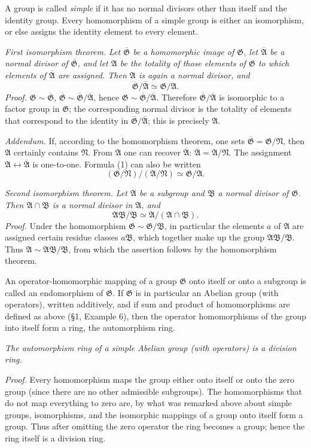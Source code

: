 \documentclass[11pt]{article}
\providecommand{\mG}{\mathfrak{G}}
\providecommand{\mA}{\mathfrak{A}}
\providecommand{\mB}{\mathfrak{B}}
\providecommand{\mN}{\mathfrak{N}}
\begin{document}
A group is called \emph{simple} if it has no normal divisors other than itself and the identity group. Every homomorphism of a simple group is either an isomorphism, or else assigns the identity element to every element.

\emph{First isomorphism theorem.} \emph{Let $\overline{\mG}$ be a homomorphic image of $\mG$, let $\overline{\mA}$ be a normal divisor of $\overline{\mG}$, and let $\mA$ be the totality of those elements of $\mG$ to which elements of $\overline{\mA}$ are assigned. Then $\mA$ is again a normal divisor, and}
\[
        \overline{\mG}/\overline{\mA}\simeq \mG/\mA. \tag{1}
\]
\emph{Proof.} $\mG\sim\overline{\mG}$, $\overline{\mG}\sim\overline{\mG}/\overline{\mA}$, hence $\mG\sim\overline{\mG}/\overline{\mA}$. Therefore $\overline{\mG}/\overline{\mA}$ is isomorphic to a factor group in $\mG$; the corresponding normal divisor is the totality of elements that correspond to the identity in $\overline{\mG}/\overline{\mA}$; this is precisely $\mA$.

\emph{Addendum.} If, according to the homomorphism theorem, one sets $\overline{\mG}=\mG/\mN$, then $\mA$ certainly contains $\mN$. From $\mA$ one can recover $\overline{\mA}$: $\overline{\mA}=\mA/\mN$. The assignment $\mA\leftrightarrow\overline{\mA}$ is one-to-one. Formula (1) can also be written
\[
        (\mG/\mN)/(\mA/\mN)\simeq \mG/\mA.
\]

\emph{Second isomorphism theorem.} \emph{Let $\mA$ be a subgroup and $\mB$ a normal divisor of $\mG$. Then $\mA\cap\mB$ is a normal divisor in $\mA$, and}
\[
        \mA\mB/\mB\simeq \mA/(\mA\cap\mB).
\]
\emph{Proof.} Under the homomorphism $\mG\sim\mG/\mB$, in particular the elements $a$ of $\mA$ are assigned certain residue classes $a\mB$, which together make up the group $\mA\mB/\mB$. Thus $\mA\sim\mA\mB/\mB$, from which the assertion follows by the homomorphism theorem.

An operator-homomorphic mapping of a group $\mG$ onto itself or onto a subgroup is called an endomorphism of $\mG$. If $\mG$ is in particular an Abelian group (with operators), written additively, and if sum and product of homomorphisms are defined as above (§1, Example 6), then the operator homomorphisms of the group into itself form a ring, the automorphism ring.

\emph{The automorphism ring of a simple Abelian group (with operators) is a division ring.}

\emph{Proof.} Every homomorphism maps the group either onto itself or onto the zero group (since there are no other admissible subgroups). The homomorphisms that do not map everything to zero are, by what was remarked above about simple groups, isomorphisms, and the isomorphic mappings of a group onto itself form a group. Thus after omitting the zero operator the ring becomes a group; hence the ring itself is a division ring.
\end{document}

